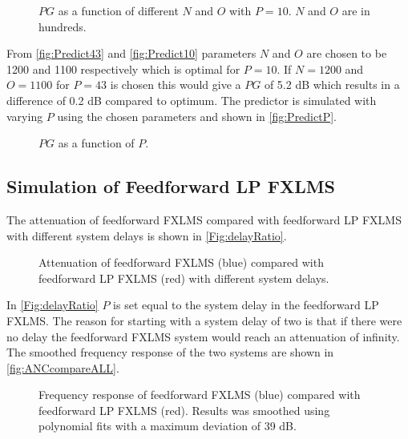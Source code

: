 \begin{figure}[H]
	\centering
	
	\caption{$PG$ as a function of different $N$ and $O$ with $P=10$. $N$ and $O$ are in hundreds.}
	\label{fig:Predict10}
\end{figure}

From \autoref{fig:Predict43} and \autoref{fig:Predict10} parameters $N$ and $O$ are chosen to be 1200 and 1100 respectively which is optimal for $P=10$. If $N=1200$ and $O=1100$ for $P=43$ is chosen this would give a $PG$ of 5.2 dB which results in a difference of 0.2 dB compared to optimum.
The predictor is simulated with varying $P$ using the chosen parameters and shown in \autoref{fig:PredictP}.

\begin{figure}[H]
	\centering
	
	\caption{$PG$ as a function of $P$.}
	\label{fig:PredictP}
\end{figure}



\subsection{Simulation of Feedforward LP FXLMS}
The attenuation of feedforward FXLMS compared with feedforward LP FXLMS with different system delays is shown in \autoref{Fig:delayRatio}.
\begin{figure}[H]
	\centering
	
	\caption{Attenuation of feedforward FXLMS (blue) compared with feedforward LP FXLMS (red) with different system delays.}
	\label{Fig:delayRatio}
\end{figure}
In \autoref{Fig:delayRatio} $P$ is set equal to the system delay in the feedforward LP FXLMS. The reason for starting with a system delay of two is that if there were no delay the feedforward FXLMS system would reach an attenuation of infinity. The smoothed frequency response of the two systems are shown in \autoref{fig:ANCcompareALL}.  

\begin{figure}[H]
	\centering
	
	\caption{Frequency response of feedforward FXLMS (blue) compared with feedforward LP FXLMS (red). Results was smoothed using polynomial fits with a maximum deviation of 39 dB.}
	\label{fig:ANCcompareALL}
\end{figure}        
        




